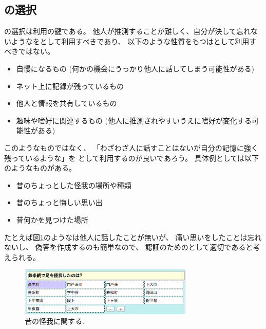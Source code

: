 \documentclass[twoside]{wiss}
\begin{document}
\subsection{{\SQ}の選択}
\label{goodquestions}

{\SQ}の選択は{\EP}利用の鍵である。
他人が推測することが難しく、自分が決して忘れないような{\EM}を{\SQ}として利用すべきであり、
以下のような性質をもつ{\EM}は{\SQ}として利用すべきではない。

\begin{itemize}
\item \textsf{自慢になるもの
(何かの機会にうっかり他人に話してしまう可能性がある)}

\vspace{-1mm}
\item \textsf{ネット上に記録が残っているもの}

\vspace{-1mm}
\item \textsf{他人と情報を共有しているもの}

\vspace{-1mm}
\item \textsf{趣味や嗜好に関連するもの
(他人に推測されやすいうえに嗜好が変化する可能性がある)}

\end{itemize}

\noindent
このようなものではなく、
「わざわざ人に話すことはないが自分の記憶に強く残っているような{\EM}」を
{\SQ}として利用するのが良いであろう。
具体例としては以下のようなものがある。

\begin{itemize}
\item 昔のちょっとした怪我の場所や種類

\vspace{-1mm}
\item 昔のちょっと悔しい思い出

\vspace{-1mm}
\item 昔何かを見つけた場所
\end{itemize}

たとえば図\ref{kega}のような{\SQ}は他人に話したことが無いが、
痛い思いをしたことは忘れないし、
偽答を作成するのも簡単なので、
認証のための{\SQ}として適切であると考えられる。

\begin{figure}[H]
\centerline{\includegraphics[width=83mm,bb=0 0 502 138]{figures/5c50eed4646232e070646f87b2c8565c.png}}
\caption{昔の怪我に関する{\SQ}.}
\label{kega}
\end{figure}
\end{document}
